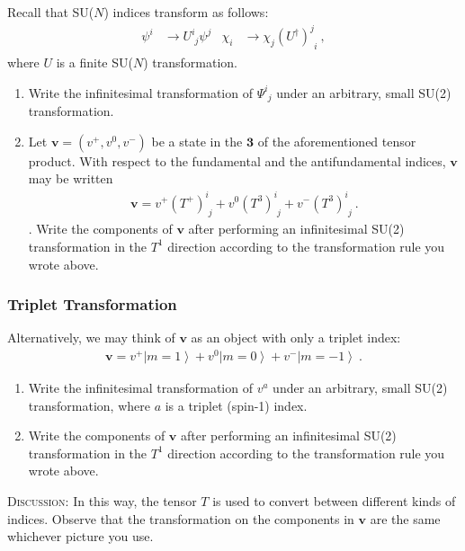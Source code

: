 \documentclass[12pt]{article}
\numberwithin{equation}{subsection}    %
\renewcommand{\vec}[1]{\mathbf{#1}} %
\newcommand{\ket}[1]{\left|#1\right\rangle}    %
\begin{document}
Recall that SU($N$) indices transform as follows:
\begin{align}
  \psi^i &\to U^i_{\phantom{i}j} \psi ^j
  &
  \chi_i &\to  \chi_j (U^\dag)^j_{\phantom{j}i} \ ,
\end{align}
where $U$ is a finite SU($N$) transformation.

\begin{enumerate}
  \item Write the infinitesimal transformation of $\Psi^i_{\phantom{i}j}$ under an arbitrary, small SU(2) transformation.
  \item Let $\vec{v} = (v^+, v^0, v^-)$ be a state in the $\mathbf{3}$ of the aforementioned tensor product. With respect to the fundamental and the antifundamental indices, $\mathbf{v}$ may be written
  \begin{align}
    \vec{v} = v^+ (T^+)^i_{\phantom{i}j} + v^0 (T^3)^i_{\phantom{i}j} + v^- (T^3)^i_{\phantom{i}j} \ .
  \end{align}.
  Write the components of $\vec{v}$ after performing an infinitesimal SU(2) transformation in the $T^1$ direction according to the transformation rule you wrote above.
\end{enumerate}

\subsubsection{Triplet Transformation}
Alternatively, we may think of $\vec{v}$ as an object with only a triplet index:
\begin{align}
  \vec{v} = v^+ \ket{m=1} + v^0 \ket{m=0} + v^- \ket{m=-1} \ .
\end{align}
\begin{enumerate}
  \item Write the infinitesimal transformation of $v^a$ under an arbitrary, small SU(2) transformation, where $a$ is a triplet (spin-1) index.
  \item Write the components of $\vec{v}$ after performing an infinitesimal SU(2) transformation in the $T^1$ direction according to the transformation rule you wrote above.
\end{enumerate}

\textsc{Discussion}: In this way, the tensor $T$ is used to convert between different kinds of indices. Observe that the transformation on the components in $\vec{v}$ are the same whichever picture you use.



%
%
%
%
\end{document}
